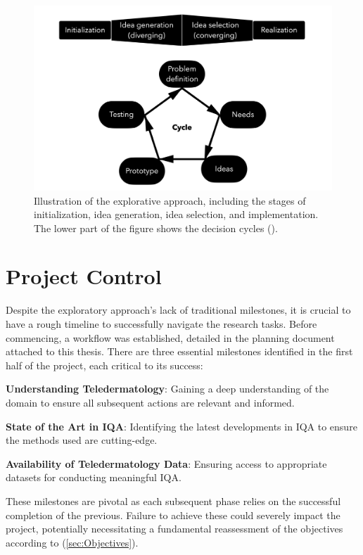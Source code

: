 \begin{figure}[ht]
    \centering
    \includegraphics[keepaspectratio,width=15cm]{img/DecisionCycle.png}
    \caption{Illustration of the explorative approach, including the stages of initialization, idea generation, idea selection, and implementation. The lower part of the figure shows the decision cycles (\cite{DesignThinking}).}
    \label{fig:decision_cycle}
\end{figure}

\section{Project Control}
\label{sec:ProjectMonitoring}
Despite the exploratory approach's lack of traditional milestones, it is crucial to have a rough timeline to successfully navigate the research tasks. Before commencing, a workflow was established, detailed in the planning document attached to this thesis. There are three essential milestones identified in the first half of the project, each critical to its success: \par
\vspace{\baselineskip}
\noindent
\textbf{Understanding Teledermatology}: Gaining a deep understanding of the domain to ensure all subsequent actions are relevant and informed. \par
\noindent
\textbf{State of the Art in IQA}: Identifying the latest developments in IQA to ensure the methods used are cutting-edge. \par
\noindent
\textbf{Availability of Teledermatology Data}:  Ensuring access to appropriate datasets for conducting meaningful IQA. \par
\vspace{\baselineskip}
\noindent
These milestones are pivotal as each subsequent phase relies on the successful completion of the previous. Failure to achieve these could severely impact the project, potentially necessitating a fundamental reassessment of the objectives according to (\autoref{sec:Objectives}). \par

